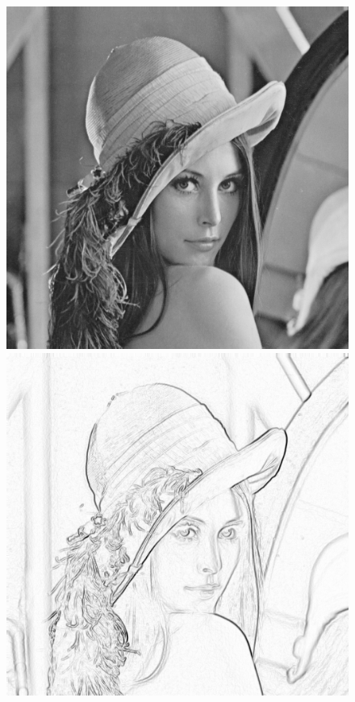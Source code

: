 \documentclass[12pt]{amsart}
\begin{document}
\begin{figure}
\includegraphics[width=\linewidth]{lena.png}
\endminipage\hfill
{}
\includegraphics[width=\linewidth]{lena_gradient_edges.png}

\end{figure}
\end{document}
